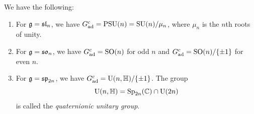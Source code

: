\begin{example}
  We have the following:
  \begin{enumerate}
    \item For $\mathfrak{g} = \mathfrak{sl}_n$,
      we have $G_{\mathrm{ad}}^c = \mathrm{PSU}(n) = \operatorname{SU}(n) / \mu_n$,
      where $\mu_n$ is the $n$th roots
      of unity.
    \item For $\mathfrak{g} = \mathfrak{so}_{n}$,
      we have $G_{\mathrm{ad}}^c = \operatorname{SO}(n)$
      for odd $n$ and
      $G_{\mathrm{ad}}^c = \operatorname{SO}(n) / \{\pm 1\}$ for even $n$.
    \item For $\mathfrak{g} = \mathfrak{sp}_{2n}$,
      we have
      $G_{\mathrm{ad}}^c = \operatorname{U}(n, \mathbb{H}) / \{\pm 1\}$.
      The group
      \[
        \operatorname{U}(n, \mathbb{H})
        = \operatorname{Sp}_{2n}(\mathbb{C}) \cap \operatorname{U}(2n)
      \]
      is called the \emph{quaternionic unitary group}.
  \end{enumerate}
\end{example}


